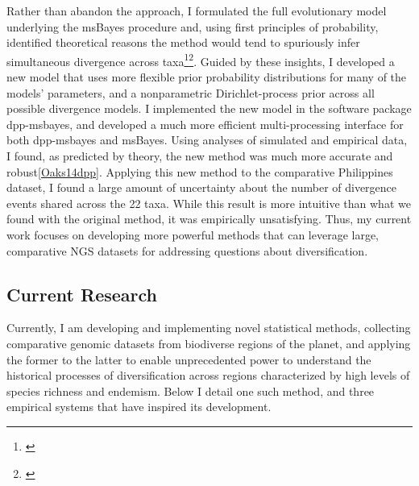 Rather than abandon the approach, I formulated the full evolutionary model
underlying the msBayes procedure and, using first 
principles of probability, identified theoretical reasons the method
would tend to spuriously infer simultaneous divergence across
taxa\footnote{\label{Oaks12}}\super{,}\footnote{\label{Oaks14reply}}.
Guided by these insights, I developed a new model that uses more flexible prior
probability distributions for many of the models' parameters, and a
nonparametric Dirichlet-process prior across all possible divergence models.
I implemented the new model in the software package dpp-msbayes, and developed
a much more efficient multi-processing interface for both dpp-msbayes and
msBayes.
Using analyses of simulated and empirical data, I found, as predicted by
theory, the new method was much more accurate and robust\cref{Oaks14dpp}.
Applying this new method to the comparative Philippines dataset, I found a
large amount of uncertainty about the number of divergence events shared across
the 22 taxa.
While this result is more intuitive than what we found with the original
method, it was empirically unsatisfying.
Thus, my current work focuses on developing more powerful methods that can
leverage large, comparative NGS datasets for addressing questions about
diversification.


\subsection*{Current Research}
Currently, I am developing and implementing novel statistical methods,
collecting comparative genomic datasets from biodiverse regions of the planet,
and applying the former to the latter to enable unprecedented power to
understand the historical processes of diversification across regions
characterized by high levels of species richness and endemism.
Below I detail one such method, and three empirical systems that have inspired
its development.

